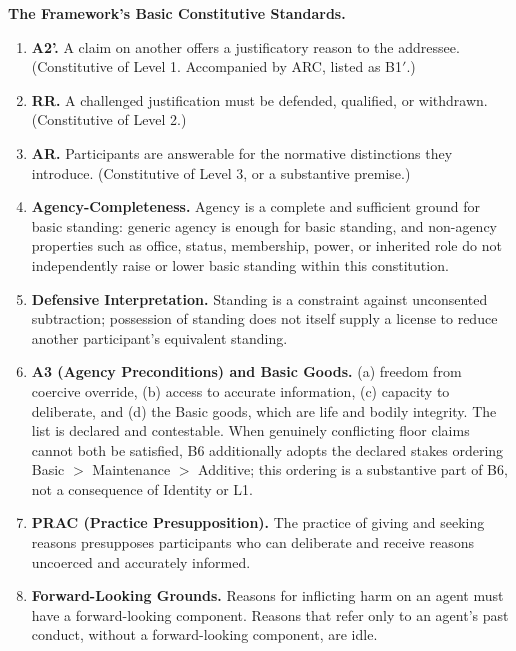 \documentclass[11pt]{article}
\def\ensuremath#1{#1}%
\def\mathrm#1{#1}%
\newcommand{\Atwo}{\texorpdfstring{\ensuremath{\mathrm{A2}'}}{A2'}}
\begin{document}
\begin{paperbox}
\textbf{The Framework's Basic Constitutive Standards.}
\begin{enumerate}[label=(B\arabic*)]
\item \textbf{\Atwo{}.} A claim on another offers a justificatory reason to the addressee. (Constitutive of Level 1. Accompanied by ARC, listed as B1$'$.)
\item \textbf{RR.} A challenged justification must be defended, qualified, or withdrawn. (Constitutive of Level 2.)
\item \textbf{AR.} Participants are answerable for the normative distinctions they introduce. (Constitutive of Level 3, or a substantive premise.)
\item \textbf{Agency-Completeness.} Agency is a complete and sufficient ground for basic standing: generic agency is enough for basic standing, and non-agency properties such as office, status, membership, power, or inherited role do not independently raise or lower basic standing within this constitution.
\item \textbf{Defensive Interpretation.} Standing is a constraint against unconsented subtraction; possession of standing does not itself supply a license to reduce another participant's equivalent standing.
\item \textbf{A3 (Agency Preconditions) and Basic Goods.} (a) freedom from coercive override, (b) access to accurate information, (c) capacity to deliberate, and (d) the Basic goods, which are life and bodily integrity. The list is declared and contestable. When genuinely conflicting floor claims cannot both be satisfied, B6 additionally adopts the declared stakes ordering Basic $>$ Maintenance $>$ Additive; this ordering is a substantive part of B6, not a consequence of Identity or L1.
\item \textbf{PRAC (Practice Presupposition).} The practice of giving and seeking reasons presupposes participants who can deliberate and receive reasons uncoerced and accurately informed.
\item \textbf{Forward-Looking Grounds.} Reasons for inflicting harm on an agent must have a forward-looking component. Reasons that refer only to an agent's past conduct, without a forward-looking component, are idle.
\end{enumerate}
\end{paperbox}
\end{document}
